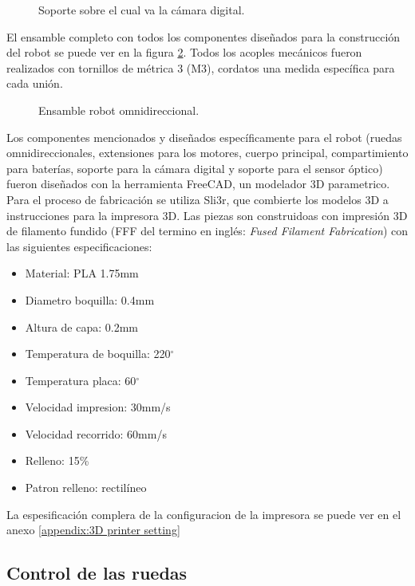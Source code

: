 \documentclass{iccmemoria}
\begin{document}
\begin{figure}[H]
  \centering
  
  \caption{Soporte sobre el cual va la cámara digital.}
  \label{fig:camera_holder}
\end{figure}

El ensamble completo con todos los componentes diseñados para la construcción del robot se puede ver en la figura \ref{fig:robot_assembly}. Todos los acoples mecánicos fueron realizados con tornillos de métrica 3 (M3), cordatos una medida específica para cada unión.

\begin{figure}[H]
  \centering
  
  \caption{Ensamble robot omnidireccional.}
  \label{fig:robot_assembly}
\end{figure}

Los componentes mencionados y diseñados específicamente para el robot (ruedas omnidireccionales, extensiones para los motores, cuerpo principal, compartimiento para baterías, soporte para la cámara digital y soporte para el sensor óptico) fueron diseñados con la herramienta FreeCAD, un modelador 3D parametrico. Para el proceso de fabricación se utiliza Sli3r, que combierte los modelos 3D a instrucciones para la impresora 3D. Las piezas son construidoas con impresión 3D de filamento fundido (FFF del termino en inglés: \emph{Fused Filament Fabrication}) con las siguientes especificaciones:\\

\begin{itemize}
	\item Material: PLA 1.75mm
	\item Diametro boquilla: 0.4mm
	\item Altura de capa: 0.2mm
	\item Temperatura de boquilla: 220$^{\circ}$
	\item Temperatura placa: 60$^{\circ}$
	\item Velocidad impresion: 30mm/s
	\item Velocidad recorrido: 60mm/s
	\item Relleno: 15\%
	\item Patron relleno: rectilíneo
\end{itemize}

La espesificación complera de la configuracion de la impresora se puede ver en el anexo \ref{appendix:3D printer setting}

\subsection{Control de las ruedas}
\end{document}
